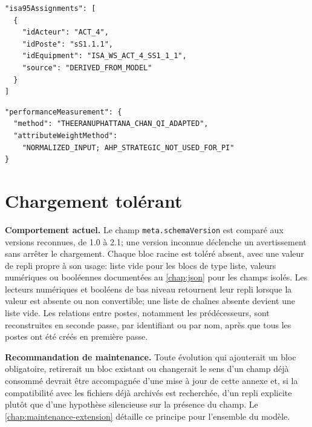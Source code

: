 \begin{verbatim}
"isa95Assignments": [
  {
    "idActeur": "ACT_4",
    "idPoste": "sS1.1.1",
    "idEquipment": "ISA_WS_ACT_4_SS1_1_1",
    "source": "DERIVED_FROM_MODEL"
  }
]
\end{verbatim}

\begin{verbatim}
"performanceMeasurement": {
  "method": "THEERANUPHATTANA_CHAN_QI_ADAPTED",
  "attributeWeightMethod":
    "NORMALIZED_INPUT; AHP_STRATEGIC_NOT_USED_FOR_PI"
}
\end{verbatim}

\section{Chargement tolérant}


\textbf{Comportement actuel.} Le champ \texttt{meta.schemaVersion} est comparé aux versions reconnues, de 1.0 à 2.1; une version inconnue déclenche un avertissement sans arrêter le chargement. Chaque bloc racine est toléré absent, avec une valeur de repli propre à son usage: liste vide pour les blocs de type liste, valeurs numériques ou booléennes documentées au \cref{chap:json} pour les champs isolés. Les lecteurs numériques et booléens de bas niveau retournent leur repli lorsque la valeur est absente ou non convertible; une liste de chaînes absente devient une liste vide. Les relations entre postes, notamment les prédécesseurs, sont reconstruites en seconde passe, par identifiant ou par nom, après que tous les postes ont été créés en première passe.

\textbf{Recommandation de maintenance.} Toute évolution qui ajouterait un bloc obligatoire, retirerait un bloc existant ou changerait le sens d'un champ déjà consommé devrait être accompagnée d'une mise à jour de cette annexe et, si la compatibilité avec les fichiers déjà archivés est recherchée, d'un repli explicite plutôt que d'une hypothèse silencieuse sur la présence du champ. Le \cref{chap:maintenance-extension} détaille ce principe pour l'ensemble du modèle.
